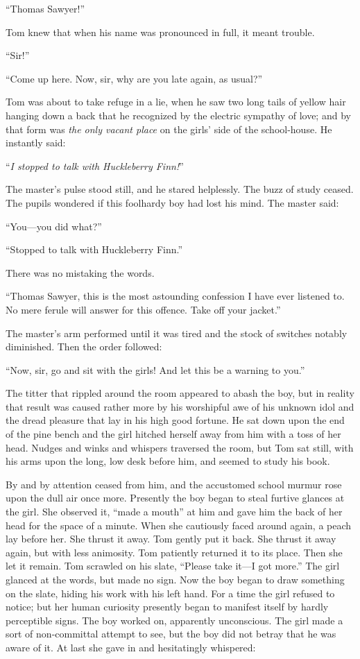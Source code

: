 \documentclass{book}
\begin{document}
“Thomas Sawyer!”

Tom knew that when his name was pronounced in full, it meant trouble.

“Sir!”

“Come up here. Now, sir, why are you late again, as usual?”

Tom was about to take refuge in a lie, when he saw two long tails of yellow hair hanging down a back that he recognized by the electric sympathy of love; and by that form was \emph{the only vacant place} on the girls’ side of the school-house. He instantly said:

“\emph{I stopped to talk with Huckleberry Finn!}”

The master’s pulse stood still, and he stared helplessly. The buzz of study ceased. The pupils wondered if this foolhardy boy had lost his mind. The master said:

“You—you did what?”

“Stopped to talk with Huckleberry Finn.”

There was no mistaking the words.

“Thomas Sawyer, this is the most astounding confession I have ever listened to. No mere ferule will answer for this offence. Take off your jacket.”

The master’s arm performed until it was tired and the stock of switches notably diminished. Then the order followed:

“Now, sir, go and sit with the girls! And let this be a warning to you.”

The titter that rippled around the room appeared to abash the boy, but in reality that result was caused rather more by his worshipful awe of his unknown idol and the dread pleasure that lay in his high good fortune. He sat down upon the end of the pine bench and the girl hitched herself away from him with a toss of her head. Nudges and winks and whispers traversed the room, but Tom sat still, with his arms upon the long, low desk before him, and seemed to study his book.

By and by attention ceased from him, and the accustomed school murmur rose upon the dull air once more. Presently the boy began to steal furtive glances at the girl. She observed it, “made a mouth” at him and gave him the back of her head for the space of a minute. When she cautiously faced around again, a peach lay before her. She thrust it away. Tom gently put it back. She thrust it away again, but with less animosity. Tom patiently returned it to its place. Then she let it remain. Tom scrawled on his slate, “Please take it—I got more.” The girl glanced at the words, but made no sign. Now the boy began to draw something on the slate, hiding his work with his left hand. For a time the girl refused to notice; but her human curiosity presently began to manifest itself by hardly perceptible signs. The boy worked on, apparently unconscious. The girl made a sort of non-committal attempt to see, but the boy did not betray that he was aware of it. At last she gave in and hesitatingly whispered:
\end{document}
